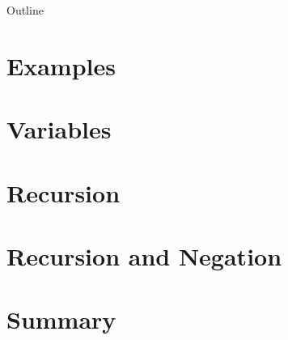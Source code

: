 \newcommand{\myinput}[1]{
\ifx\inlibrary\undefined
  
\else
  
\fi
}

\myinput{ezasp/macros}
\myinput{ezasp/summary}
\myinput{ezasp/motivation}
\begin{frame}{Outline}
  \medskip
  \tableofcontents
\end{frame}
\section{Examples}
\myinput{ezasp/example1}
\myinput{ezasp/example2}
\section{Variables}
\myinput{ezasp/example3}
\myinput{ezasp/example4}
\section{Recursion}
\myinput{ezasp/example5}
\myinput{ezasp/example6}
\myinput{ezasp/traveling}
\myinput{ezasp/oddeven}
\section{Recursion and Negation}
\myinput{ezasp/negative}
\section{Summary}
%
%
%
%
